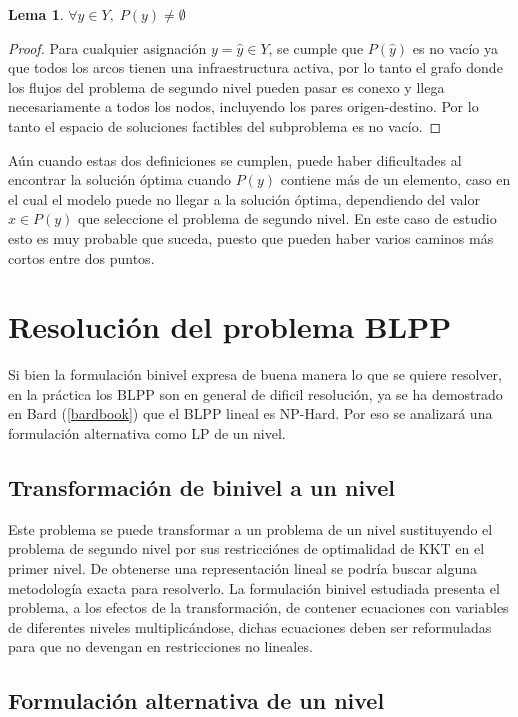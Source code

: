 \documentclass{article}
\newtheorem{lemma}{Lema}
\begin{document}
  \begin{lemma}$\forall y \in Y,\; P(y) \neq \emptyset$
  \end{lemma}

  \begin{proof}
    Para cualquier asignación $y = \hat{y} \in Y$, se cumple que $P(\hat{y})$ es no vacío ya que todos los arcos tienen una infraestructura activa, por lo tanto el grafo donde los flujos del problema de segundo nivel pueden pasar es conexo y llega necesariamente a todos los nodos, incluyendo los pares origen-destino. Por lo tanto el espacio de soluciones factibles del subproblema es no vacío. 
  \end{proof}

  Aún cuando estas dos definiciones se cumplen, puede haber dificultades al encontrar la solución óptima cuando $P(y)$ contiene más de un elemento, caso en el cual el modelo puede no llegar a la solución óptima, dependiendo del valor $x \in P(y)$ que seleccione el problema de segundo nivel. En este caso de estudio esto es muy probable que suceda, puesto que pueden haber varios caminos más cortos entre dos puntos.

  \section*{Resolución del problema BLPP}

  Si bien la formulación binivel expresa de buena manera lo que se quiere resolver, en la práctica los BLPP son en general de dificil resolución, ya se ha demostrado en Bard (\ref{bardbook}) que el BLPP lineal es NP-Hard. Por eso se analizará una formulación alternativa como LP de un nivel.

  \subsection*{Transformación de binivel a un nivel}

  Este problema se puede transformar a un problema de un nivel sustituyendo el problema de segundo nivel por sus restricciónes de optimalidad de KKT en el primer nivel. De obtenerse una representación lineal se podría buscar alguna metodología exacta para resolverlo. La formulación binivel estudiada presenta el problema, a los efectos de la transformación, de contener ecuaciones con variables de diferentes niveles multiplicándose, dichas ecuaciones deben ser reformuladas para que no devengan en restricciones no lineales.

  \subsection*{Formulación alternativa de un nivel}
  \label{altOneLevelFormulation}
\end{document}
